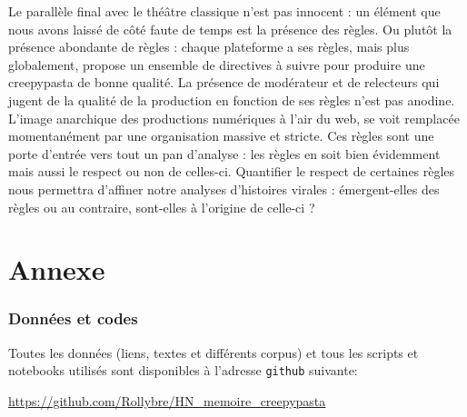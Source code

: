 \documentclass[12pt,a4paper,oneside,titlepage]{book} %
\begin{document}
Le parallèle final avec le théâtre classique n'est pas innocent : un élément que nous avons laissé de côté faute de temps est la présence des règles. Ou plutôt la présence abondante de règles : chaque plateforme a ses règles, mais plus globalement, propose un ensemble de directives à suivre pour produire une creepypasta de bonne qualité. 
La présence de modérateur et de relecteurs qui jugent de la qualité de la production en fonction de ses règles n'est pas anodine. 
L'image anarchique des productions numériques à l'air du web, se voit remplacée momentanément par une organisation massive et stricte. Ces règles sont une porte d'entrée vers tout un pan d'analyse : les règles en soit bien évidemment mais aussi le respect ou non de celles-ci. Quantifier le respect de certaines règles nous permettra d'affiner notre analyses d'histoires virales : émergent-elles des règles ou au contraire, sont-elles à l'origine de celle-ci ? 

	\pagebreak


\backmatter
	\part{Annexe}
	\section*{Données et codes}
	Toutes les données (liens, textes et différents corpus) et tous les scripts et notebooks utilisés sont disponibles à l'adresse \texttt{github} suivante: 
	
	\begin{centering}
		\url{https://github.com/Rollybre/HN_memoire_creepypasta}
	\end{centering}
	\bigskip\\
	\bigskip
	\bigskip
\end{document}
